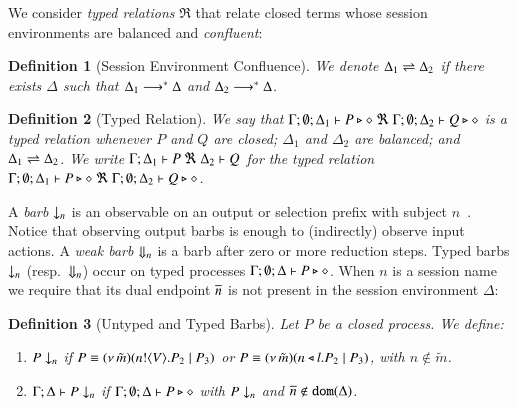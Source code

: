 \documentclass[preprint,11pt]{elsarticle}
\newtheorem{definition}{Definition}[section]
\begin{document}
{We consider \emph{typed relations} $\Re$ that relate  closed terms whose
session environments %
are balanced  and \emph{confluent}:

\begin{definition}[Session Environment Confluence]
	We denote $\Delta_1 \rightleftharpoons \Delta_2$ if there exists $\Delta$ such that
	$\Delta_1 \longrightarrow^\ast \Delta$ and $\Delta_2 \longrightarrow^\ast \Delta$.
\end{definition}



\begin{definition}[Typed Relation]
	We say that
	$\Gamma; \emptyset; \Delta_1 \vdash P \triangleright \diamond\ \Re \ \Gamma; \emptyset; \Delta_2 \vdash Q \triangleright \diamond$
	is a {\em typed relation} whenever
	$P$ and $Q$ are closed;
	$\Delta_1$ and $\Delta_2$ are balanced; and 
	$\Delta_1 \rightleftharpoons \Delta_2$.
	We write $\horel{\Gamma}{\Delta_1}{P}{\ \Re \ }{\Delta_2}{Q}$
	for the typed relation $\Gamma; \emptyset; \Delta_1 \vdash P \triangleright \diamond\ \Re \ \Gamma; \emptyset; \Delta_2 \vdash Q \triangleright \diamond$.
\end{definition}


A \emph{barb} $\downarrow_{n}$ is an observable on an output or selection prefix with subject $n$~\cite{MiSa92}.
Notice that observing output barbs is enough to (indirectly) observe input actions.
A \emph{weak barb} $\Downarrow_{n}$ is a barb after zero or more reduction steps.
Typed barbs $\downarrow_{n}$ (resp.\ $\Downarrow_{n}$)
occur on typed processes $\Gamma; \emptyset; \Delta \vdash P \triangleright \diamond$.
When $n$ is a session name we require that its dual endpoint $\overline{n}$ is not present
in the session environment $\Delta$:

\begin{definition}[Untyped and Typed Barbs]\label{d:barb}%
	Let $P$ be a closed process. We define:
	\begin{enumerate}[1.]
		\item	
		$P \downarrow_{n}$ if $P \equiv (\nu\, \tilde{m})(n ! \langle V \rangle . P_2 \;|\; P_3)$
		or $P \equiv (\nu\, \tilde{m})(n \triangleleft l . P_2 \;|\; P_3)$, 
		with $n \notin \tilde{m}$. %

		\item	$\Gamma; \Delta \vdash P \downarrow_{n}$ if
			$\Gamma; \emptyset; \Delta \vdash P \triangleright \diamond$ with $P \downarrow_{n}$ and $\overline{n} \notin \mathtt{dom}(\Delta)$.


\end{enumerate}
\end{definition}}
\end{document}
